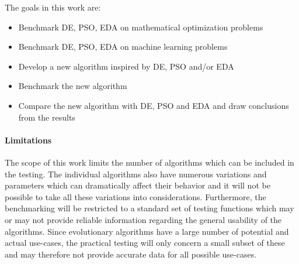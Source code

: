 The goals in this work are:
\begin{itemize}
  \item Benchmark DE, PSO, EDA on mathematical optimization problems
  \item Benchmark DE, PSO, EDA on machine learning problems
  \item Develop a new algorithm inspired by DE, PSO and/or EDA
  \item Benchmark the new algorithm
  \item Compare the new algorithm with DE, PSO and EDA and draw conclusions from the results
\end{itemize}

\paragraph{Limitations}

The scope of this work limits the number of algorithms which can be included in the testing. The individual algorithms also have numerous variations and parameters which can dramatically affect their behavior and it will not be possible to take all these variations into considerations. Furthermore, the benchmarking will be restricted to a standard set of testing functions which may or may not provide reliable information regarding the general usability of the algorithms. Since evolutionary algorithms have a large number of potential and actual use-cases, the practical testing will only concern a small subset of these and may therefore not provide accurate data for all possible use-cases.
